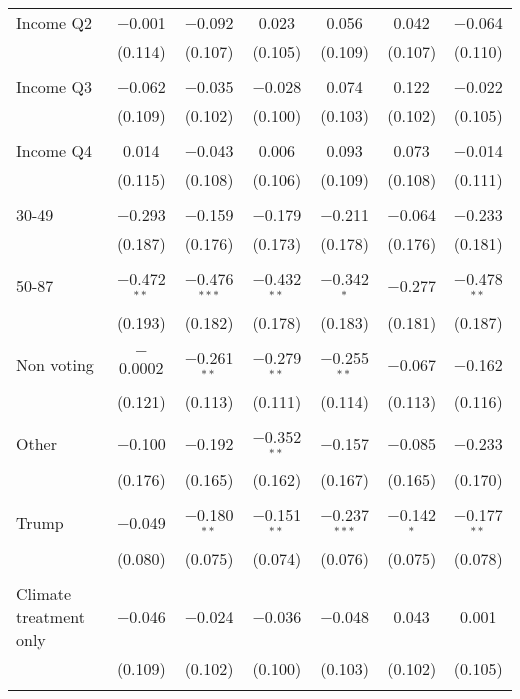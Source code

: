 \begin{tabular}{@{\extracolsep{5pt}}lcccccc}
 Income Q2 & $-$0.001 & $-$0.092 & 0.023 & 0.056 & 0.042 & $-$0.064 \\ 
  & (0.114) & (0.107) & (0.105) & (0.109) & (0.107) & (0.110) \\ 
  & & & & & & \\ 
 Income Q3 & $-$0.062 & $-$0.035 & $-$0.028 & 0.074 & 0.122 & $-$0.022 \\ 
  & (0.109) & (0.102) & (0.100) & (0.103) & (0.102) & (0.105) \\ 
  & & & & & & \\ 
 Income Q4 & 0.014 & $-$0.043 & 0.006 & 0.093 & 0.073 & $-$0.014 \\ 
  & (0.115) & (0.108) & (0.106) & (0.109) & (0.108) & (0.111) \\ 
  & & & & & & \\ 
 30-49 & $-$0.293 & $-$0.159 & $-$0.179 & $-$0.211 & $-$0.064 & $-$0.233 \\ 
  & (0.187) & (0.176) & (0.173) & (0.178) & (0.176) & (0.181) \\ 
  & & & & & & \\ 
 50-87 & $-$0.472$^{**}$ & $-$0.476$^{***}$ & $-$0.432$^{**}$ & $-$0.342$^{*}$ & $-$0.277 & $-$0.478$^{**}$ \\ 
  & (0.193) & (0.182) & (0.178) & (0.183) & (0.181) & (0.187) \\ 
  & & & & & & \\ 
 Non voting & $-$0.0002 & $-$0.261$^{**}$ & $-$0.279$^{**}$ & $-$0.255$^{**}$ & $-$0.067 & $-$0.162 \\ 
  & (0.121) & (0.113) & (0.111) & (0.114) & (0.113) & (0.116) \\ 
  & & & & & & \\ 
 Other & $-$0.100 & $-$0.192 & $-$0.352$^{**}$ & $-$0.157 & $-$0.085 & $-$0.233 \\ 
  & (0.176) & (0.165) & (0.162) & (0.167) & (0.165) & (0.170) \\ 
  & & & & & & \\ 
 Trump & $-$0.049 & $-$0.180$^{**}$ & $-$0.151$^{**}$ & $-$0.237$^{***}$ & $-$0.142$^{*}$ & $-$0.177$^{**}$ \\ 
  & (0.080) & (0.075) & (0.074) & (0.076) & (0.075) & (0.078) \\ 
  & & & & & & \\ 
 Climate treatment only & $-$0.046 & $-$0.024 & $-$0.036 & $-$0.048 & 0.043 & 0.001 \\ 
  & (0.109) & (0.102) & (0.100) & (0.103) & (0.102) & (0.105) \\ 
  & & & & & & \\ 

\end{tabular}
